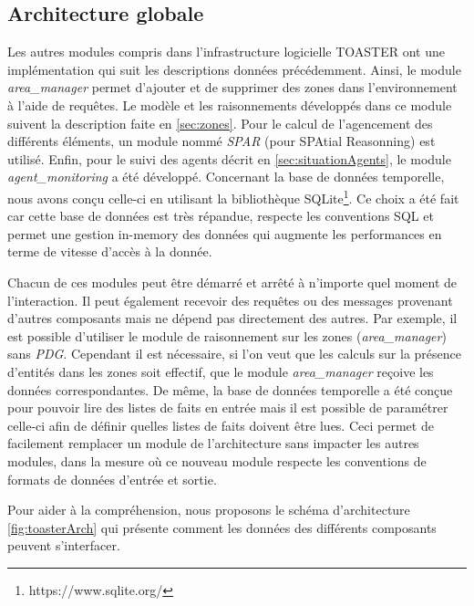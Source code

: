 \documentclass[a4paper,11pt,twoside]{StyleThese}
\begin{document}
\subsection{Architecture globale}
Les autres modules compris dans l'infrastructure logicielle TOASTER ont une implémentation qui suit les descriptions données précédemment.
Ainsi, le module \textit{area\_manager} permet d'ajouter et de supprimer des zones dans l'environnement à l'aide de requêtes. Le modèle et les raisonnements développés dans ce module suivent la description faite en \ref{sec:zones}. Pour le calcul de l'agencement des différents éléments, un module nommé \textit{SPAR} (pour SPAtial Reasonning) est utilisé. Enfin, pour le suivi des agents décrit en \ref{sec:situationAgents}, le module \textit{agent\_monitoring} a été développé.
Concernant la base de données temporelle, nous avons conçu celle-ci en utilisant la bibliothèque SQLite\footnote{https://www.sqlite.org/}. Ce choix a été fait car cette base de données est très répandue, respecte les conventions SQL et permet une gestion in-memory des données qui augmente les performances en terme de vitesse d'accès à la donnée.

Chacun de ces modules peut être démarré et arrêté à n'importe quel moment de l'interaction. Il peut également recevoir des requêtes ou des messages provenant d'autres composants mais ne dépend pas directement des autres. Par exemple, il est possible d'utiliser le module de raisonnement sur les zones (\textit{area\_manager}) sans \textit{PDG}. Cependant il est nécessaire, si l'on veut que les calculs sur la présence d'entités dans les zones soit effectif, que le module \textit{area\_manager} reçoive les données correspondantes.
De même, la base de données temporelle a été conçue pour pouvoir lire des listes de faits en entrée mais il est possible de paramétrer celle-ci afin de définir quelles listes de faits doivent être lues.
Ceci permet de facilement remplacer un module de l'architecture sans impacter les autres modules, dans la mesure où ce nouveau module respecte les conventions de formats de données d'entrée et sortie.

Pour aider à la compréhension, nous proposons le schéma d'architecture \ref{fig:toasterArch} qui présente comment les données des différents composants peuvent s'interfacer.
\end{document}
